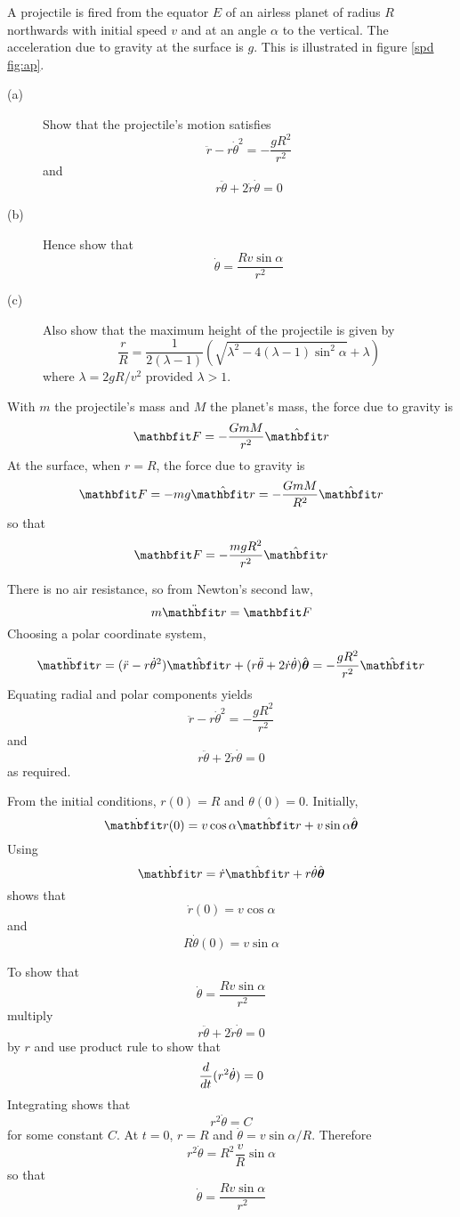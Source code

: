 \begin{example}
\problem
A projectile is fired from the equator $E$ of an airless planet of radius
$R$ northwards with initial speed $v$ and at an angle $\alpha$ to the
vertical.  The acceleration due to gravity at the surface is $g$.
This is illustrated in figure \ref{spd fig:ap}. 

\begin{description}
\item[(a)] Show that the projectile's motion satisfies
$$\ddot{r}-r\dot{\theta}^2=-\frac{gR^2}{r^2}$$
and
$$r\ddot{\theta}+2\dot{r}\dot{\theta}=0$$

\item[(b)] Hence show that 
$$\dot{\theta}=\frac{Rv\sin\alpha}{r^2}$$

\item[(c)] Also show that the maximum height of the projectile is given by
$$\frac{r}{R}=\frac{1}{2(\lambda-1)}\left(
\sqrt{\lambda^2-4(\lambda-1)\sin^2\alpha}+\lambda\right)$$
where $\lambda=2gR/v^2$ provided $\lambda>1$.
\end{description}

\solution
With $m$ the projectile's mass and $M$ the planet's mass, the force due to 
gravity is
$$\vect{F}=-\frac{GmM}{r^2}\rvect$$
At the surface, when $r=R$, the force due to gravity is
$$\vect{F}=-mg\rvect=-\frac{GmM}{R^2}\rvect$$
so that
$$\vect{F}=-\frac{mgR^2}{r^2}\rvect$$

There is no air resistance, so from Newton's second law,
$$m\ddot{\vect{r}}=\vect{F}$$
Choosing a polar coordinate system,
$$\ddot{\vect{r}}=(\ddot{r}-r\dot{\theta}^2)\rvect
+(r\ddot{\theta}+2\dot{r}\dot{\theta})\tvect=-\frac{gR^2}{r^2}\rvect$$
Equating radial and polar components yields
$$\ddot{r}-r\dot{\theta}^2=-\frac{gR^2}{r^2}$$
and
$$r\ddot{\theta}+2\dot{r}\dot{\theta}=0$$
as required.


From the initial conditions, $r(0)=R$ and $\theta(0)=0$.  Initially,
$$\dot{\vect{r}}(0)=v\cos\alpha\rvect+v\sin\alpha\tvect$$
Using
$$\dot{\vect{r}}=\dot{r}\rvect+r\dot{\theta}\tvect$$
shows that
$$\dot{r}(0)=v\cos\alpha$$
and
$$R\dot{\theta}(0)=v\sin\alpha$$

To show that
$$\dot{\theta}=\frac{Rv\sin\alpha}{r^2}$$
multiply
$$r\ddot{\theta}+2\dot{r}\dot{\theta}=0$$
by $r$ and use product rule to show that
$$\frac{d}{d{t}}(r^2\dot{\theta})=0$$
Integrating shows that
$$r^2\dot{\theta}=C$$
for some constant $C$.  At $t=0$, $r=R$ and
$\dot{\theta}=v\sin\alpha/R$.  Therefore
$$r^2\dot{\theta}=R^2\frac{v}{R}\sin\alpha$$
so that
$$\dot{\theta}=\frac{Rv\sin\alpha}{r^2}$$


\end{example}
